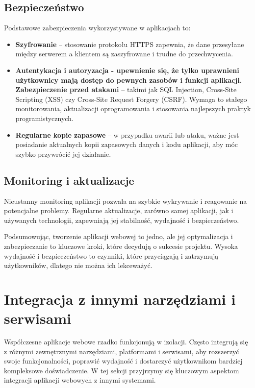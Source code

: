 \subsection{Bezpieczeństwo}
Podstawowe zabezpieczenia wykorzystywane w aplikacjach to:

\begin{itemize}
\item \textbf{Szyfrowanie} -- stosowanie protokołu HTTPS zapewnia, że dane przesyłane między serwerem a klientem są zaszyfrowane i trudne do przechwycenia.
\item \textbf{Autentykacja i autoryzacja - upewnienie się, że tylko uprawnieni użytkownicy mają dostęp do pewnych zasobów i funkcji aplikacji.
Zabezpieczenie przed atakami} -- takimi jak SQL Injection, Cross-Site Scripting (XSS) czy Cross-Site Request Forgery (CSRF). Wymaga to stałego monitorowania, aktualizacji oprogramowania i stosowania najlepszych praktyk programistycznych.
\item \textbf{Regularne kopie zapasowe} -- w przypadku awarii lub ataku, ważne jest posiadanie aktualnych kopii zapasowych danych i kodu aplikacji, aby móc szybko przywrócić jej działanie\cite{sekurakBezpieczenstwo}.
\end{itemize}

\subsection{Monitoring i aktualizacje}

Nieustanny monitoring aplikacji pozwala na szybkie wykrywanie i reagowanie na potencjalne problemy. Regularne aktualizacje, zarówno samej aplikacji, jak i używanych technologii, zapewniają jej stabilność, wydajność i bezpieczeństwo.

Podsumowując, tworzenie aplikacji webowej to jedno, ale jej optymalizacja i zabezpieczanie to kluczowe kroki, które decydują o sukcesie projektu. Wysoka wydajność i bezpieczeństwo to czynniki, które przyciągają i zatrzymują użytkowników, dlatego nie można ich lekceważyć.

\section{Integracja z innymi narzędziami i serwisami}

Współczesne aplikacje webowe rzadko funkcjonują w izolacji. Często integrują się z różnymi zewnętrznymi narzędziami, platformami i serwisami, aby rozszerzyć swoje funkcjonalności, poprawić wydajność i dostarczyć użytkownikom bardziej kompleksowe doświadczenie. W tej sekcji przyjrzymy się kluczowym aspektom integracji aplikacji webowych z innymi systemami.


